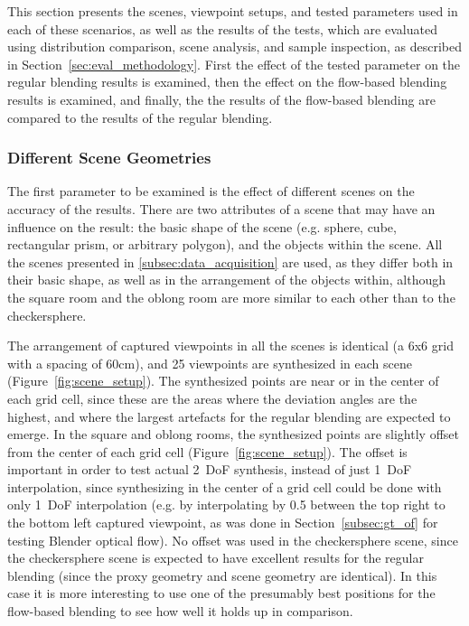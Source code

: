 This section presents the scenes, viewpoint setups, and tested parameters used in each of these scenarios, as well as the results of the tests, which are evaluated using distribution comparison, scene analysis, and sample inspection, as described in Section~\ref{sec:eval_methodology}. First the effect of the tested parameter on the regular blending results is examined, then the effect on the flow-based blending results is examined, and finally, the the results of the flow-based blending are compared to the results of the regular blending.

\subsubsection{Different Scene Geometries}
The first parameter to be examined is the effect of different scenes on the accuracy of the results. There are two attributes of a scene that may have an influence on the result: the basic shape of the scene (e.g. sphere, cube, rectangular prism, or arbitrary polygon), and the objects within the scene. All the scenes presented in \ref{subsec:data_acquisition} are used, as they differ both in their basic shape, as well as in the arrangement of the objects within, although the square room and the oblong room are more similar to each other than to the checkersphere.

The arrangement of captured viewpoints in all the scenes is identical (a 6x6 grid with a spacing of 60cm), and 25 viewpoints are synthesized in each scene (Figure~\ref{fig:scene_setup}). The synthesized points are near or in the center of each grid cell, since these are the areas where the deviation angles are the highest, and where the largest artefacts for the regular blending are expected to emerge. In the square and oblong rooms, the synthesized points are slightly offset from the center of each grid cell (Figure~\ref{fig:scene_setup}). The offset is important in order to test actual 2~DoF synthesis, instead of just 1~DoF interpolation, since synthesizing in the center of a grid cell could be done with only 1~DoF interpolation (e.g. by interpolating by 0.5 between the top right to the bottom left captured viewpoint, as was done in Section~\ref{subsec:gt_of} for testing Blender optical flow). No offset was used in the checkersphere scene, since the checkersphere scene is expected to have excellent results for the regular blending (since the proxy geometry and scene geometry are identical). In this case it is more interesting to use one of the presumably best positions for the flow-based blending to see how well it holds up in comparison.

